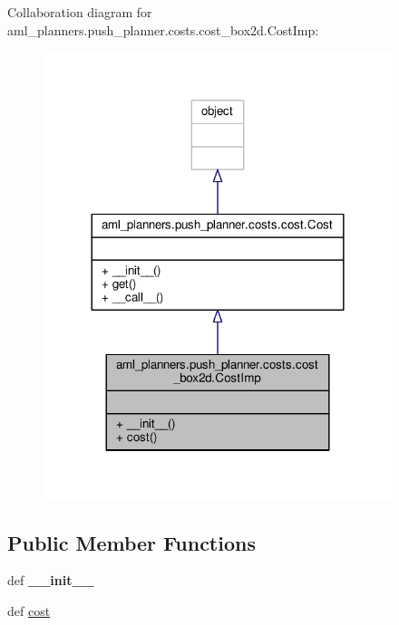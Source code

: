 Collaboration diagram for aml\-\_\-planners.\-push\-\_\-planner.\-costs.\-cost\-\_\-box2d.\-Cost\-Imp\-:
\nopagebreak
\begin{figure}[H]
\begin{center}
\leavevmode
\includegraphics[width=288pt]{classaml__planners_1_1push__planner_1_1costs_1_1cost__box2d_1_1_cost_imp__coll__graph}
\end{center}
\end{figure}
\subsection*{Public Member Functions}
\begin{DoxyCompactItemize}
\item 
\hypertarget{classaml__planners_1_1push__planner_1_1costs_1_1cost__box2d_1_1_cost_imp_a81315a7c3e7d482f0a8acc03b0122683}{def {\bfseries \-\_\-\-\_\-init\-\_\-\-\_\-}}\label{classaml__planners_1_1push__planner_1_1costs_1_1cost__box2d_1_1_cost_imp_a81315a7c3e7d482f0a8acc03b0122683}

\item 
def \hyperlink{classaml__planners_1_1push__planner_1_1costs_1_1cost__box2d_1_1_cost_imp_ae0609d38535dfb4456debd1081211bb1}{cost}
\end{DoxyCompactItemize}


